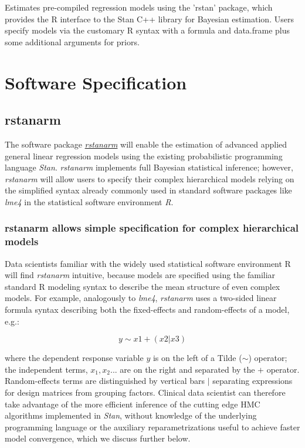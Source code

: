 \documentclass[11pt,notitlepage]{article}
\begin{document}
Estimates pre-compiled regression models using the 'rstan' package, which provides
the R interface to the Stan C++ library for Bayesian estimation. Users specify models via the customary R syntax with a formula and data.frame plus some additional arguments for priors.

\section*{Software Specification}

\subsection*{rstanarm}
The software package \href{https://github.com/stan-dev/rstanarm}{\textit{rstanarm}}
will enable the estimation of advanced applied general linear regression models using 
the existing probabilistic programming language \textit{Stan}. 
\textit{rstanarm} implements full Bayesian statistical inference;  
however, \textit{rstanarm} will allow users to specify their complex 
hierarchical models relying on the simplified syntax already commonly 
used in standard software packages like \textit{lme4} in the statistical 
software environment \textit{R}. 

\subsubsection*{rstanarm allows simple specification for complex hierarchical models}

Data scientists familiar with the widely used statistical software environment R will 
find \textit{rstanarm} intuitive, because models are specified using the familiar 
standard R modeling syntax to describe the mean structure of even complex models. 
For example, analogously to \textit{lme4}, \textit{rstanarm} uses a two-sided 
linear formula syntax describing both the fixed-effects and random-effects of 
a model, e.g.:

\begin{figure}
\vspace{-20pt}
\begin{equation}
y \sim x1 +(x2|x3)
\end{equation}
\vspace{-30pt}
\end{figure}

where the dependent response variable $y$ is on the left of a Tilde ($\sim$) operator; 
the independent terms, $x_1, x_2...$ are on the right and separated by the $+$ 
operator. Random-effects terms are distinguished by vertical bars $|$ 
separating expressions for design matrices from grouping factors. Clinical data 
scientist can therefore take advantage of the  more efficient inference of the 
cutting edge HMC algorithms implemented in \textit{Stan}, without knowledge of 
the underlying programming language or the auxiliary reparametrizations useful to 
achieve faster model convergence, which we discuss further below.
\end{document}
